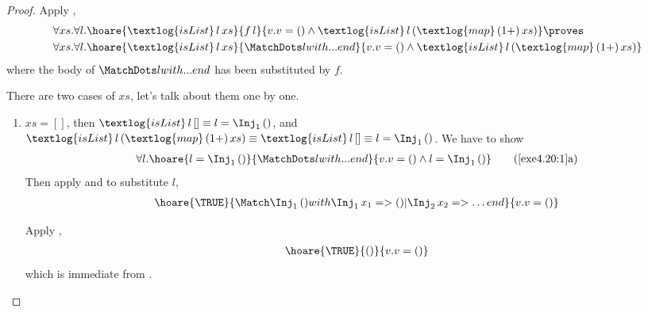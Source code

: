 \begin{proof}
  Apply ,
  \begin{align}
    & \forall xs. \forall l. \hoare{\textlog{isList}\, l\, xs}{f\, l}
    {v.v = () \wedge \textlog{isList}\, l\, (\textlog{map}\, (1+)\, xs)} \proves
    \notag \\
    & \forall xs. \forall l. \hoare{\textlog{isList}\, l\, xs}
    {\MatchDots l with...end}
    {v.v = () \wedge \textlog{isList}\, l\, (\textlog{map}\, (1+)\, xs)}
    \label{exe4.20:1}
  \end{align}
  where the body of $\MatchDots l with...end$ has been substituted by $f$.

  There are two cases of $xs$, let's talk about them one by one.
  \begin{enumerate}
    \item $xs = []$, then $\textlog{isList}\, l\, [] \equiv l =
      \Inj_1\, ()$, and $\textlog{isList}\, l\,
      (\textlog{map}\, (1+)\, xs) \equiv \textlog{isList}\, l\, [] \equiv
      l = \Inj_1\, ()$. We have to show
      \begin{align}
        \forall l. \hoare{l = \Inj_1\, ()}{\MatchDots l with...end}
        {v.v = () \wedge l = \Inj_1\, ()}
        \tag{\ref{exe4.20:1}a} \label{4.20:1a}
      \end{align}
      Then apply  and  to substitute $l$,
      \begin{align*}
        \hoare{\TRUE}{
          \Match \Inj_1\, () with
          \Inj_1\, x_1 => () | \Inj_2\, x_2 => \ldots end
        } {v.v = ()}
      \end{align*}

      Apply ,
      \begin{align*}
        \hoare{\TRUE}{()} {v.v = ()}
      \end{align*}
      which is immediate from .


\end{enumerate}
\end{proof}
